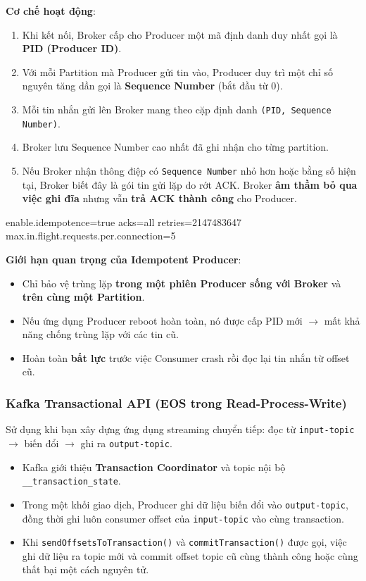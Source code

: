 \documentclass[12pt]{article}
\begin{document}
\textbf{Cơ chế hoạt động}:
\begin{enumerate}
    \item Khi kết nối, Broker cấp cho Producer một mã định danh duy nhất gọi là \textbf{PID (Producer ID)}.
    \item Với mỗi Partition mà Producer gửi tin vào, Producer duy trì một chỉ số nguyên tăng dần gọi là \textbf{Sequence Number} (bắt đầu từ 0).
    \item Mỗi tin nhắn gửi lên Broker mang theo cặp định danh \texttt{(PID, Sequence Number)}.
    \item Broker lưu Sequence Number cao nhất đã ghi nhận cho từng partition.
    \item Nếu Broker nhận thông điệp có \texttt{Sequence Number} nhỏ hơn hoặc bằng số hiện tại, Broker biết đây là gói tin gửi lặp do rớt ACK. Broker \textbf{âm thầm bỏ qua việc ghi đĩa} nhưng vẫn \textbf{trả ACK thành công} cho Producer.
\end{enumerate}

\begin{aivnplainbox}
enable.idempotence=true
acks=all
retries=2147483647
max.in.flight.requests.per.connection=5
\end{aivnplainbox}

\begin{notebox}
\textbf{Giới hạn quan trọng của Idempotent Producer}:
\begin{itemize}
    \item Chỉ bảo vệ trùng lặp \textbf{trong một phiên Producer sống với Broker} và \textbf{trên cùng một Partition}.
    \item Nếu ứng dụng Producer reboot hoàn toàn, nó được cấp PID mới $\rightarrow$ mất khả năng chống trùng lặp với các tin cũ.
    \item Hoàn toàn \textbf{bất lực} trước việc Consumer crash rồi đọc lại tin nhắn từ offset cũ.
\end{itemize}
\end{notebox}

\subsubsection{Kafka Transactional API (EOS trong Read-Process-Write)}

Sử dụng khi bạn xây dựng ứng dụng streaming chuyển tiếp: đọc từ \texttt{input-topic} $\rightarrow$ biến đổi $\rightarrow$ ghi ra \texttt{output-topic}.

\begin{itemize}
    \item Kafka giới thiệu \textbf{Transaction Coordinator} và topic nội bộ \texttt{\_\_transaction\_state}.
    \item Trong một khối giao dịch, Producer ghi dữ liệu biến đổi vào \texttt{output-topic}, đồng thời ghi luôn consumer offset của \texttt{input-topic} vào cùng transaction.
    \item Khi \texttt{sendOffsetsToTransaction()} và \texttt{commitTransaction()} được gọi, việc ghi dữ liệu ra topic mới và commit offset topic cũ cùng thành công hoặc cùng thất bại một cách nguyên tử.
\end{itemize}
\end{document}
